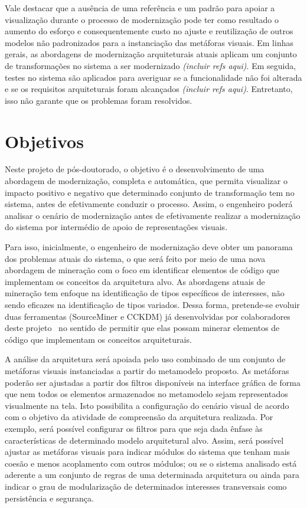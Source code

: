 \documentclass[12pt]{article}
\begin{document}
Vale destacar que a ausência de uma referência e um padrão para apoiar a visualização durante o processo de modernização pode ter como resultado o aumento do esforço e consequentemente custo no ajuste e reutilização de outros modelos não padronizados para a instanciação das metáforas visuais. Em linhas gerais, as abordagens de modernização arquiteturais atuais aplicam um conjunto de transformações no sistema a ser modernizado \textit{(incluir refs aqui)}. Em seguida, testes no sistema são aplicados para averiguar se a funcionalidade não foi alterada e se os requisitos arquiteturais foram alcançados \textit{(incluir refs aqui)}. Entretanto, isso não garante que os problemas foram resolvidos. 

\section{Objetivos}

Neste projeto de pós-doutorado, o objetivo é o desenvolvimento de uma abordagem de modernização, completa e automática, que permita visualizar o impacto positivo e negativo que determinado conjunto de transformação tem no sistema, antes de efetivamente conduzir o processo. Assim, o engenheiro poderá analisar o cenário de modernização antes de efetivamente realizar a modernização do sistema por intermédio de apoio de representações visuais.

Para isso, inicialmente, o engenheiro de modernização deve obter um panorama dos problemas atuais do sistema, o que será feito por meio de uma nova abordagem de mineração com o foco em identificar elementos de código que implementam os conceitos da arquitetura alvo. As abordagens atuais de mineração tem enfoque na identificação de tipos específicos de interesses, não sendo eficazes na identificação de tipos variados. Dessa forma, pretende-se evoluir duas ferramentas (SourceMiner e CCKDM) já desenvolvidas por colaboradores deste projeto~\cite{source_miner_glauco, daniel_san_journal} no sentido de permitir que elas possam minerar elementos de código que implementam os conceitos arquiteturais.

A análise da arquitetura será apoiada pelo uso combinado de um conjunto de metáforas visuais instanciadas a partir do metamodelo proposto. As metáforas poderão ser ajustadas a partir dos filtros disponíveis na interface gráfica de forma que nem todos os elementos armazenados no metamodelo sejam representados visualmente na tela. Isto possibilita a configuração do cenário visual de acordo com o objetivo da atividade de compreensão da arquitetura realizada. Por exemplo, será possível configurar os filtros para que seja dada ênfase às características de determinado modelo arquitetural alvo. Assim, será possível ajustar as metáforas visuais para indicar módulos do sistema que tenham mais coesão e menos acoplamento com outros módulos; ou se o sistema analisado está aderente a um conjunto de regras de uma determinada arquitetura ou ainda para indicar o grau de modularização de determinados interesses transversais como persistência e segurança.
\end{document}
